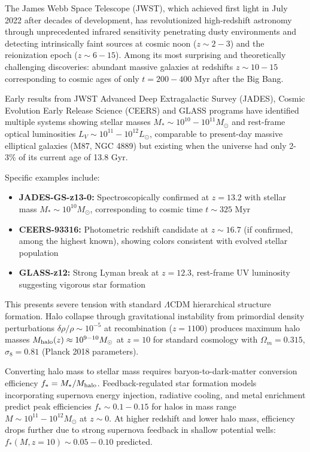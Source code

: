 \documentclass[11pt,a4paper]{article}
\providecommand{\tightlist}{\setlength{\itemsep}{0pt}\setlength{\parskip}{0pt}}
\begin{document}
The James Webb Space Telescope (JWST), which achieved first light in
July 2022 after decades of development, has revolutionized high-redshift
astronomy through unprecedented infrared sensitivity penetrating dusty
environments and detecting intrinsically faint sources at cosmic noon
(\(z \sim 2-3\)) and the reionization epoch (\(z \sim 6-15\)). Among its
most surprising and theoretically challenging discoveries: abundant
massive galaxies at redshifts \(z \sim 10-15\) corresponding to cosmic
ages of only \(t = 200-400\) Myr after the Big Bang.

Early results from JWST Advanced Deep Extragalactic Survey (JADES),
Cosmic Evolution Early Release Science (CEERS) and GLASS programs have
identified multiple systems showing stellar masses
\(M_* \sim 10^{10}-10^{11} M_\odot\) and rest-frame optical luminosities
\(L_V \sim 10^{11}-10^{12} L_\odot\), comparable to present-day massive
elliptical galaxies (M87, NGC 4889) but existing when the universe had
only 2-3\% of its current age of 13.8 Gyr.

Specific examples include:

\begin{itemize}
\tightlist
\item
  \textbf{JADES-GS-z13-0:} Spectroscopically confirmed at \(z = 13.2\)
  with stellar mass \(M_* \sim 10^{10} M_\odot\), corresponding to
  cosmic time \(t \sim 325\) Myr
\item
  \textbf{CEERS-93316:} Photometric redshift candidate at
  \(z \sim 16.7\) (if confirmed, among the highest known), showing
  colors consistent with evolved stellar population
\item
  \textbf{GLASS-z12:} Strong Lyman break at \(z = 12.3\), rest-frame UV
  luminosity suggesting vigorous star formation
\end{itemize}

This presents severe tension with standard \(\Lambda\)CDM hierarchical
structure formation. Halo collapse through gravitational instability
from primordial density perturbations \(\delta\rho/\rho \sim 10^{-5}\)
at recombination (\(z = 1100\)) produces maximum halo masses
\(M_{\rm halo}(z) \approx 10^{9-10} M_\odot\) at \(z = 10\) for standard
cosmology with \(\Omega_m = 0.315\), \(\sigma_8 = 0.81\) (Planck 2018
parameters).

Converting halo mass to stellar mass requires baryon-to-dark-matter
conversion efficiency \(f_* = M_*/M_{\rm halo}\). Feedback-regulated
star formation models incorporating supernova energy injection,
radiative cooling, and metal enrichment predict peak efficiencies
\(f_* \sim 0.1-0.15\) for halos in mass range
\(M \sim 10^{11}-10^{12} M_\odot\) at \(z \sim 0\). At higher redshift
and lower halo mass, efficiency drops further due to strong supernova
feedback in shallow potential wells: \(f_*(M, z=10) \sim 0.05-0.10\)
predicted.
\end{document}
